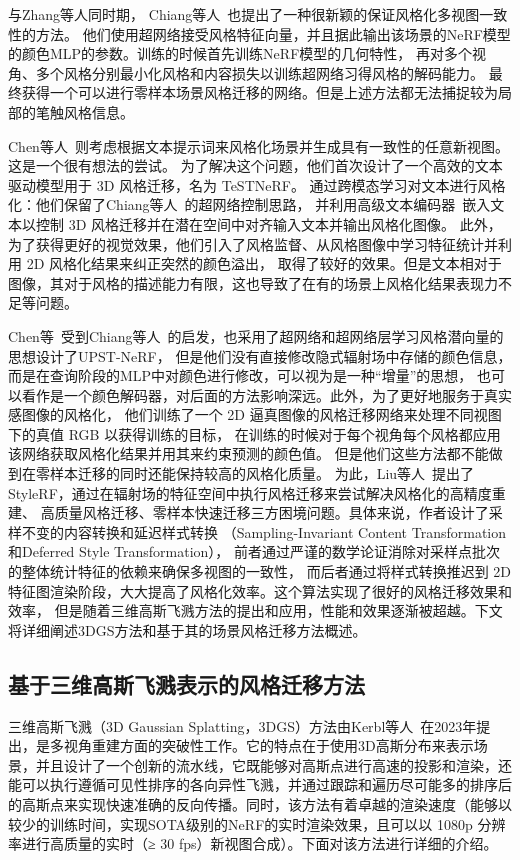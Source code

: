 \par 与Zhang等人同时期， Chiang等人~\cite{chiang2022stylizing}也提出了一种很新颖的保证风格化多视图一致性的方法。
他们使用超网络接受风格特征向量，并且据此输出该场景的NeRF模型的颜色MLP的参数。训练的时候首先训练NeRF模型的几何特性，
再对多个视角、多个风格分别最小化风格和内容损失以训练超网络习得风格的解码能力。
最终获得一个可以进行零样本场景风格迁移的网络。但是上述方法都无法捕捉较为局部的笔触风格信息。

\par Chen等人~\cite{chen2023testnerf}则考虑根据文本提示词来风格化场景并生成具有一致性的任意新视图。这是一个很有想法的尝试。
为了解决这个问题，他们首次设计了一个高效的文本驱动模型用于 3D 风格迁移，名为 TeSTNeRF。
通过跨模态学习对文本进行风格化：他们保留了Chiang等人~\cite{chiang2022stylizing}的超网络控制思路，
并利用高级文本编码器~\cite{radford2021learning}嵌入文本以控制 3D 风格迁移并在潜在空间中对齐输入文本并输出风格化图像。
此外，为了获得更好的视觉效果，他们引入了风格监督、从风格图像中学习特征统计并利用 2D 风格化结果来纠正突然的颜色溢出，
取得了较好的效果。但是文本相对于图像，其对于风格的描述能力有限，这也导致了在有的场景上风格化结果表现力不足等问题。

\par Chen等~\cite{chen2024upst}受到Chiang等人~\cite{chiang2022stylizing}的启发，也采用了超网络和超网络层学习风格潜向量的思想设计了UPST-NeRF，
但是他们没有直接修改隐式辐射场中存储的颜色信息，而是在查询阶段的MLP中对颜色进行修改，可以视为是一种“增量”的思想，
也可以看作是一个颜色解码器，对后面的方法影响深远。此外，为了更好地服务于真实感图像的风格化，
他们训练了一个 2D 逼真图像的风格迁移网络来处理不同视图下的真值 RGB 以获得训练的目标，
在训练的时候对于每个视角每个风格都应用该网络获取风格化结果并用其来约束预测的颜色值。
但是他们这些方法都不能做到在零样本迁移的同时还能保持较高的风格化质量。
为此，Liu等人~\cite{liu2023stylerf}提出了StyleRF，通过在辐射场的特征空间中执行风格迁移来尝试解决风格化的高精度重建、
高质量风格迁移、零样本快速迁移三方困境问题。具体来说，作者设计了采样不变的内容转换和延迟样式转换
（Sampling-Invariant Content Transformation 和Deferred Style Transformation），
前者通过严谨的数学论证消除对采样点批次的整体统计特征的依赖来确保多视图的一致性，
而后者通过将样式转换推迟到 2D 特征图渲染阶段，大大提高了风格化效率。这个算法实现了很好的风格迁移效果和效率，
但是随着三维高斯飞溅方法的提出和应用，性能和效果逐渐被超越。下文将详细阐述3DGS方法和基于其的场景风格迁移方法概述。


\subsection{基于三维高斯飞溅表示的风格迁移方法}
三维高斯飞溅（3D Gaussian Splatting，3DGS）方法由Kerbl等人~\cite{kerbl20233d}在2023年提出，是多视角重建方面的突破性工作。它的特点在于使用3D高斯分布来表示场景，并且设计了一个创新的流水线，它既能够对高斯点进行高速的投影和渲染，还能可以执行遵循可见性排序的各向异性飞溅，并通过跟踪和遍历尽可能多的排序后的高斯点来实现快速准确的反向传播。同时，该方法有着卓越的渲染速度（能够以较少的训练时间，实现SOTA级别的NeRF的实时渲染效果，且可以以 1080p 分辨率进行高质量的实时（≥ 30 fps）新视图合成）。下面对该方法进行详细的介绍。
